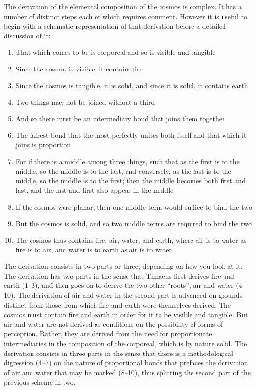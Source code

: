 The derivation of the elemental composition of the cosmos is complex. It has a number of distinct steps each of which requires comment. However it is useful to begin with a schematic representation of that derivation before a detailed discussion of it:
\begin{enumerate}
	\item That which comes to be is corporeal and so is visible and tangible
	\item Since the cosmos is visible, it contains fire
	\item Since the cosmos is tangible, it is solid, and since it is solid, it contains earth
	\item Two things may not be joined without a third 
	\item And so there must be an intermediary bond that joins them together
	\item The fairest bond that the most perfectly unites both itself and that which it joins is proportion
	\item For if there is a middle among three things, such that as the first is to the middle, so the middle is to the last, and conversely, as the last is to the middle, so the middle is to the first; then the middle becomes both first and last, and the last and first also appear in the middle
	\item If the cosmos were planar, then one middle term would suffice to bind the two
	\item But the cosmos is solid, and so two middle terms are required to bind the two
	\item The cosmos thus contains fire, air, water, and earth, where air is to water as fire is to air, and water is to earth as air is to water
\end{enumerate}
The derivation consists in two parts or three, depending on how you look at it. The derivation has two parts in the sense that Timaeus first derives fire and earth (1--3), and then goes on to derive the two other ``roots'', air and water (4--10). The derivation of air and water in the second part is advanced on grounds distinct from those from which fire and earth were themselves derived. The cosmos must contain fire and earth in order for it to be visible and tangible. But air and water are not derived as conditions on the possibility of forms of perception. Rather, they are derived from the need for proportionate intermediaries in the composition of the corporeal, which is by nature solid. The derivation consists in three parts in the sense that there is a methodological digression (4--7) on the nature of proportional bonds that prefaces the derivation of air and water that may be marked (8--10), thus splitting the second part of the previous scheme in two.

